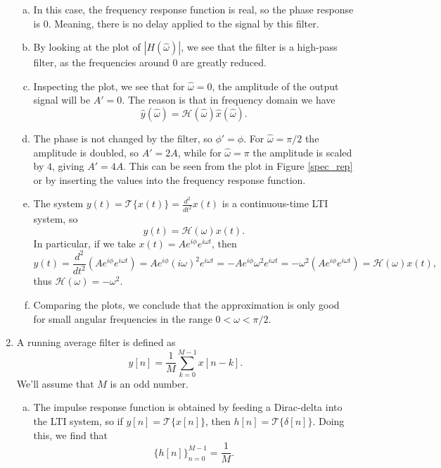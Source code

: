 \begin{enumerate}
\begin{enumerate}[a)]
\item In this case, the frequency response function is real, so the phase response is $0$. Meaning, there is no delay applied to the signal by this filter.

\item By looking at the plot of $|H(\hat{\omega})|$, we see that the filter is a high-pass filter, as the frequencies around $0$ are greatly reduced. 

\item Inspecting the plot, we see that for $\hat{\omega}=0$, the amplitude of the output signal will be $A'=0$. The reason is that in frequency domain we have
$$\hat{y}(\hat{\omega})=\mathcal{H}(\hat{\omega})\hat{x}(\hat{\omega}).$$

\item The phase is not changed by the filter, so $\phi'=\phi$. For $\hat{\omega}=\pi/2$ the amplitude is doubled, so $A'=2A$, while for $\hat{\omega}=\pi$ the amplitude is scaled by $4$, giving $A'=4A$. 
This can be seen from the plot in Figure \ref{spec_rep} or by inserting the values into the frequency response function. 

\item The system $y(t)=\mathcal{T}\{x(t)\}=\frac{d^{2}}{dt^{2}}x(t)$ is a continuous-time LTI system, so
$$y(t)=\mathcal{H}(\omega)x(t).$$
In particular, if we take $x(t)=Ae^{i\phi}e^{i\omega t}$, then
$$y(t)=\frac{d^{2}}{dt^{2}}(Ae^{i\phi}e^{i\omega t})=Ae^{i\phi}(i\omega)^{2}e^{i\omega t}=-Ae^{i\phi}\omega^{2}e^{i\omega t}=-\omega^{2}(Ae^{i\phi}e^{i\omega t})=\mathcal{H}(\omega)x(t),$$
thus $\mathcal{H}(\omega)=-\omega^{2}$. 

\item Comparing the plots, we conclude that the approximation is only good for small angular frequencies in the range $0<\omega<\pi/2$. 
\end{enumerate}

\item A running average filter is defined as
$$y[n]=\frac{1}{M}\sum_{k=0}^{M-1}x[n-k].$$
We'll assume that $M$ is an odd number. 

\begin{enumerate}[a)]
\item The impulse response function is obtained by feeding a Dirac-delta into the LTI system, so if $y[n]=\mathcal{T}\{x[n]\}$, then $h[n]=\mathcal{T}\{\delta[n]\}$. Doing this, we find that
$$\{h[n]\}_{n=0}^{M-1}=\frac{1}{M}.$$


\end{enumerate}
\end{enumerate}
